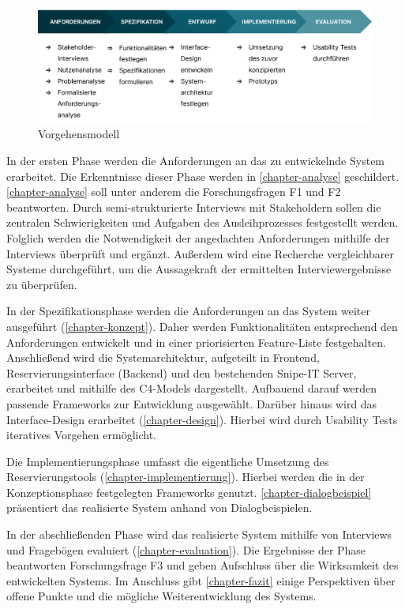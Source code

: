 \begin{figure}[h]
  \centering
  \includegraphics[scale=0.35]{Bilder/vorgehensmodel.png}
  \caption{Vorgehensmodell}
  \label{fig:vorgehen}
\end{figure}

In der ersten Phase werden die Anforderungen an das zu entwickelnde System
erarbeitet. Die Erkenntnisse dieser Phase werden in \ref{chapter-analyse}
geschildert. \ref{chapter-analyse} soll unter anderem die Forschungsfragen F1
und F2 beantworten. Durch semi-strukturierte Interviews mit Stakeholdern sollen
die zentralen Schwierigkeiten und Aufgaben des Ausleihprozesses festgestellt
werden. Folglich werden die Notwendigkeit der angedachten Anforderungen mithilfe
der Interviews überprüft und ergänzt. Außerdem wird eine Recherche
vergleichbarer Systeme durchgeführt, um die Aussagekraft der ermittelten
Interviewergebnisse zu überprüfen.

In der Spezifikationsphase werden die Anforderungen an das System weiter
ausgeführt (\ref{chapter-konzept}). Daher werden Funktionalitäten
entsprechend den Anforderungen entwickelt und in einer priorisierten
Feature-Liste festgehalten. Anschließend wird die Systemarchitektur, aufgeteilt
in Frontend, Reservierungsinterface (Backend) und den bestehenden Snipe-IT
Server, erarbeitet und mithilfe des C4-Models dargestellt. Aufbauend darauf
werden passende Frameworks zur Entwicklung ausgewählt. Darüber hinaus wird das
Interface-Design erarbeitet (\ref{chapter-design}). Hierbei wird durch Usability
Tests iteratives Vorgehen ermöglicht.


Die Implementierungsphase umfasst die eigentliche Umsetzung des
Reservierungstools (\ref{chapter-implementierung}). Hierbei werden die in der
Konzeptionsphase festgelegten Frameworks genutzt. \ref{chapter-dialogbeispiel}
präsentiert das realisierte System anhand von Dialogbeispielen.

In der abschließenden Phase wird das realisierte System mithilfe von Interviews
und Fragebögen evaluiert (\ref{chapter-evaluation}). Die Ergebnisse der Phase
beantworten Forschungsfrage F3 und geben Aufschluss über die Wirksamkeit des
entwickelten Systems. Im Anschluss gibt \ref{chapter-fazit} einige Perspektiven
über offene Punkte und die mögliche Weiterentwicklung des Systems.